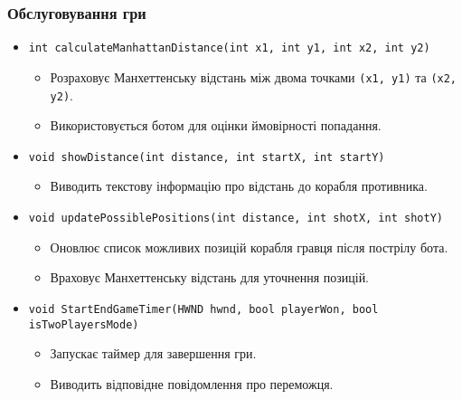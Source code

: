 \documentclass[12pt]{article}
\begin{document}
\subsubsection{Обслуговування гри}
\begin{itemize}
    \item \texttt{int calculateManhattanDistance(int x1, int y1, int x2, int y2)}
    \begin{itemize}
        \item Розраховує Манхеттенську відстань між двома точками \texttt{(x1, y1)} та \texttt{(x2, y2)}.
        \item Використовується ботом для оцінки ймовірності попадання.
    \end{itemize}
    \item \texttt{void showDistance(int distance, int startX, int startY)}
    \begin{itemize}
        \item Виводить текстову інформацію про відстань до корабля противника.
    \end{itemize}
    \item \texttt{void updatePossiblePositions(int distance, int shotX, int shotY)}
    \begin{itemize}
        \item Оновлює список можливих позицій корабля гравця після пострілу бота.
        \item Враховує Манхеттенську відстань для уточнення позицій.
    \end{itemize}
    \item \texttt{void StartEndGameTimer(HWND hwnd, bool playerWon, bool isTwoPlayersMode)}
    \begin{itemize}
        \item Запускає таймер для завершення гри.
        \item Виводить відповідне повідомлення про переможця.
    \end{itemize}
\end{itemize}
\end{document}
